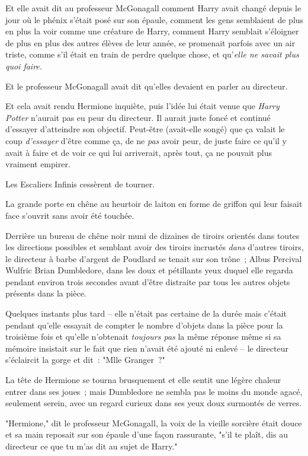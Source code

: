 Et elle avait dit au professeur McGonagall comment Harry avait changé depuis le jour où le phénix s'était posé sur son épaule, comment les gens semblaient de plus en plus la voir comme une créature de Harry, comment Harry semblait s'éloigner de plus en plus des autres élèves de leur année, se promenait parfois avec un air triste, comme s'il était en train de perdre quelque chose, et qu'\emph{elle ne savait plus quoi faire.}

Et le professeur McGonagall avait dit qu'elles devaient en parler au directeur.

Et cela avait rendu Hermione inquiète, puis l'idée lui était venue que \emph{Harry Potter} n'aurait pas eu peur du directeur. Il aurait juste foncé et continué d'essayer d'atteindre son objectif. Peut-être (avait-elle songé) que ça valait le coup \emph{d'essayer} d'être comme ça, de ne \emph{pas} avoir peur, de juste faire ce qu'il y avait à faire et de voir ce qui lui arriverait, après tout, ça ne pouvait plus vraiment empirer.

Les Escaliers Infinis cessèrent de tourner.

La grande porte en chêne au heurtoir de laiton en forme de griffon qui leur faisait face s'ouvrit sans avoir été touchée.

Derrière un bureau de chêne noir muni de dizaines de tiroirs orientés dans toutes les directions possibles et semblant avoir des tiroirs incrustés \emph{dans} d'autres tiroirs, le directeur à barbe d'argent de Poudlard se tenait sur son trône~; Albus Percival Wulfric Brian Dumbledore, dans les doux et pétillants yeux duquel elle regarda pendant environ trois secondes avant d'être distraite par tous les autres objets présents dans la pièce.

Quelques instants plus tard -- elle n'était pas certaine de la durée mais c'était pendant qu'elle essayait de compter le nombre d'objets dans la pièce pour la troisième fois et qu'elle n'obtenait \emph{toujours pas} la même réponse même si sa mémoire insistait sur le fait que rien n'avait été ajouté ni enlevé -- le directeur s'éclaircit la gorge et dit~: "Mlle Granger~?"

La tête de Hermione se tourna brusquement et elle sentit une légère chaleur entrer dans ses joues~; mais Dumbledore ne sembla pas le moins du monde agacé, seulement serein, avec un regard curieux dans ses yeux doux surmontés de verres.

"Hermione," dit le professeur McGonagall, la voix de la vieille sorcière était douce et sa main reposait sur son épaule d'une façon rassurante, "s'il te plaît, dis au directeur ce que tu m'as dit au sujet de Harry."

